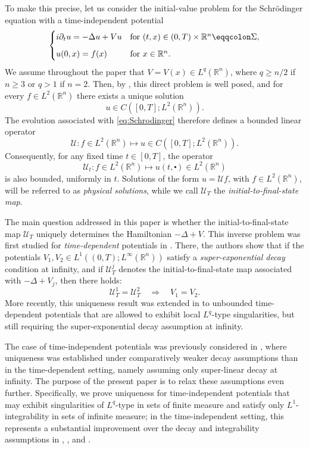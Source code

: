 \documentclass[11pt,a4paper]{amsart}
\theoremstyle{remark}
\theoremstyle{definition}
\newcommand{\R}{\mathbb{R}}
\def\cd{\centerdot}
\begin{document}
To make this precise, let us consider the initial-value problem for the Schr\"odinger equation with a time-independent potential
\begin{equation}\label{eq:Schrodinger}
\begin{cases}
i \partial_t u = -\Delta u + V u & \text{for } (t,x)\in (0, T)\times \R^n \eqqcolon \Sigma,
\vspace{.6em}
\\
u(0,x) = f(x) & \text{for } x\in \R^n.
\end{cases}
\end{equation}
We assume throughout the paper that $V=V(x)\in L^q(\R^n)$, where $q\ge n/2$ if $n\ge 3$ or $q>1$ if $n=2$. Then, by \cites{zbMATH02204588,zbMATH00179225}, this direct problem is well posed, and for every $f\in L^2(\R^n)$ there exists a unique solution
\[
u\in C\left([0,T];L^2(\R^n)\right).
\]
The evolution associated with \eqref{eq:Schrodinger} therefore defines a bounded linear operator
\[
\mathcal U : f\in L^2(\R^n)\mapsto u\in C\left([0,T];L^2(\R^n)\right).
\]
Consequently, for any fixed time $t\in[0,T]$, the operator
\[
\mathcal U_t : f \in L^2(\R^n) \mapsto u(t,\cd)\in L^2(\R^n)
\]
is also bounded, uniformly in $t$. Solutions of the form $u=\mathcal U f$, with $f\in L^2(\R^n)$, will be referred to as \emph{physical solutions}, while we call $\mathcal U_T$ the \emph{initial-to-final-state map}.

The main question addressed in this paper is whether the initial-to-final-state map $\mathcal U_T$ uniquely determines the Hamiltonian $-\Delta+V$. This inverse problem was first studied for \emph{time-dependent} potentials in \cite{zbMATH07801151}. There, the authors show that if the potentials $V_1,V_2 \in L^1((0,T);L^\infty(\R^n))$ satisfy a \emph{super-exponential decay} condition at infinity, and if $\mathcal U_T^j$ denotes the initial-to-final-state map associated with $-\Delta+V_j$, then there holds:
\[
\mathcal U_T^1=\mathcal U_T^2 \quad\Longrightarrow\quad V_1=V_2.
\]
More recently, this uniqueness result was extended in \cite{caro2025initialtofinalstateinverseproblemunbounded} to unbounded time-dependent potentials that are allowed to exhibit local $L^q$-type singularities, but still requiring the super-exponential decay assumption at infinity.

The case of time-independent potentials was previously considered in \cite{zbMATH08122191}, where uniqueness was established under comparatively weaker decay assumptions than in the time-dependent setting, namely assuming only super-linear decay at infinity. The purpose of the present paper is to relax these assumptions even further. Specifically, we prove uniqueness for time-independent potentials that may exhibit singularities of $L^q$-type in sets of finite measure and satisfy only $L^1$-integrability in sets of infinite measure; in the time-independent setting, this represents a substantial improvement over the decay and integrability assumptions in  \cite{zbMATH08122191}, \cite{zbMATH07801151}, and \cite{caro2025initialtofinalstateinverseproblemunbounded}.
\end{document}
